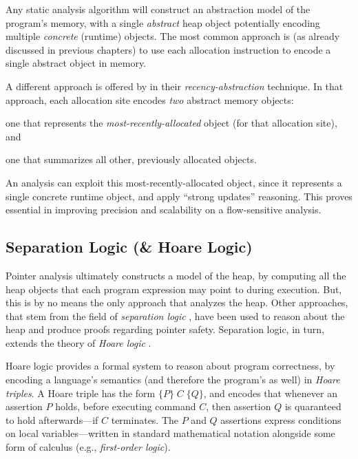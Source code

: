 Any static analysis algorithm will construct an abstraction model of the program's memory, with a single \emph{abstract} heap object potentially encoding multiple \emph{concrete} (runtime) objects. The most common approach is (as already discussed in previous chapters) to use each allocation instruction to encode a single abstract object in memory.

A different approach is offered by \citeauthor{sas:2006:Balakrishnan} \cite{sas:2006:Balakrishnan} in their \emph{recency-abstraction} technique. In that approach, each allocation site encodes \emph{two} abstract memory objects:
\begin{inparaenum}[(1)]
\item one that represents the \emph{most-recently-allocated} object (for that allocation site), and
\item one that summarizes all other, previously allocated objects.
\end{inparaenum}
An analysis can exploit this most-recently-allocated object, since it represents a single concrete runtime object, and apply ``strong updates'' reasoning. This proves essential in improving precision and scalability on a flow-sensitive analysis.


\subsection{Separation Logic (\& Hoare Logic)}

Pointer analysis ultimately constructs a model of the heap, by computing all the heap objects that each program expression may point to during execution. But, this is by no means the only approach that analyzes the heap. Other approaches, that stem from the field of \emph{separation logic} \cite{lics:2002:Reynolds,csl:2001:OHearn,popl:2001:Ishtiaq,col:2000:Reynolds,article:2011:Calcagno,article:2012:OHearn}, have been used to reason about the heap and produce proofs regarding pointer safety. Separation logic, in turn, extends the theory of \emph{Hoare logic} \cite{article:1981:Krzysztof}.

Hoare logic provides a formal system to reason about program correctness, by encoding a language's semantics (and therefore the program's as well) in \emph{Hoare triples}. A Hoare triple has the form $\{P\} \; C \;  \{Q\}$, and encodes that whenever an assertion $P$ holds, before executing command $C$, then assertion $Q$ is quaranteed to hold afterwards---if $C$ terminates. The $P$ and $Q$ assertions express conditions on local variables---written in standard mathematical notation alongside some form of calculus (e.g., \emph{first-order logic}).

